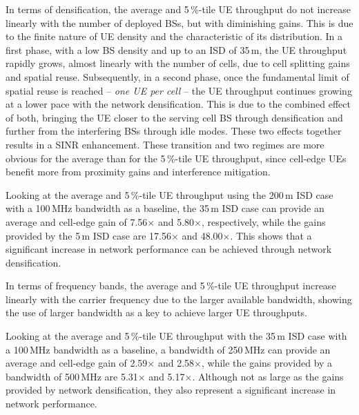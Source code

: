 \documentclass{IEEEtran}
\begin{document}
In terms  of densification,
the average and 5\,\%-tile \ac{UE} throughput do not increase linearly with the number of deployed \acp{BS},
but with diminishing gains.
This is due to the finite nature of \ac{UE} density and the characteristic of its distribution.
In a first phase,
with a low \ac{BS} density and up to an \ac{ISD} of 35\,m,
the UE throughput rapidly grows, almost linearly with the number of cells,
due to cell splitting gains and spatial reuse.
Subsequently, in a second phase,
once the fundamental limit of spatial reuse is reached -- \emph{one \ac{UE} per cell} --
the UE throughput continues growing at a lower pace with the network densification.
This is due to the combined effect of both,
bringing the UE closer to the serving cell BS through densification and further from the interfering BSs through idle modes.
These two effects together results in a \ac{SINR} enhancement.
These transition and two regimes are more obvious for the average than for the 5\,\%-tile UE throughput,
since cell-edge \acp{UE} benefit more from proximity gains and interference mitigation.


Looking at the average and 5\,\%-tile \ac{UE} throughput using the 200\,m \ac{ISD} case with a 100\,MHz bandwidth as a baseline,
the 35\,m \ac{ISD} case can provide an average and cell-edge gain of 7.56$\times$ and 5.80$\times$, respectively,
while the gains provided by the 5\,m \ac{ISD} case are 17.56$\times$ and 48.00$\times$.
This shows that a significant increase in network performance can be achieved through network densification.

In terms of frequency bands,
the average and 5\,\%-tile \ac{UE} throughput increase linearly with the carrier frequency due to the larger available bandwidth,
showing the use of larger bandwidth as a key to achieve larger \ac{UE} throughputs.

Looking at the average and 5\,\%-tile \ac{UE} throughput with the 35\,m \ac{ISD} case with a 100\,MHz bandwidth as a baseline,
a bandwidth of 250\,MHz can provide an average and cell-edge gain of 2.59$\times$ and 2.58$\times$,
while the gains provided by a bandwidth of 500\,MHz are 5.31$\times$ and 5.17$\times$.
Although not as large as the gains provided by network densification,
they also represent a significant increase in network performance.
\end{document}
